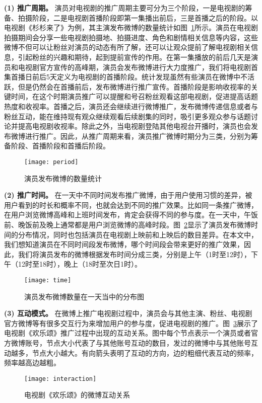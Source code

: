 \textbf{(1) 推广周期。}
演员对电视剧的推广周期主要可分为三个阶段，一是电视剧的筹备、拍摄阶段，二是电视剧首播阶段即第一集播出前后，三是首播之后的阶段。以电视剧《杉杉来了》为例，其主演发布微博的数量统计如图~\ref{shan}所示。演员在电视剧拍摄期间会分享一些电视剧拍摄地、拍摄进度、角色和剧情相关信息等内容，这些微博不但可以让粉丝对演员的动态有所了解，还可以让观众提前了解电视剧相关信息，引起粉丝的兴趣和期待，起到提前宣传的作用。在第一集播放的前后几天是演员和电视剧官方宣传的高峰期，演员会发布微博进行大力度推广，我们将电视剧首集首播日前后5天定义为电视剧的首播阶段。统计发现虽然有些演员在微博中不活跃，但是仍然会在首播前后，发布微博进行推广宣传。首播阶段是影响收视率的关键时间，在这个时期演员推广可以提醒和号召粉丝观看这部电视剧，促进提高话题热度和收视率。首播之后，演员还会继续进行微博推广，发布微博传递信息或者与粉丝互动，能在维持现有观众继续观看后续剧集的同时，吸引更多观众参与话题讨论并提高电视剧收视率。除此之外，当电视剧登陆其他电视台开播时，演员也会发布微博进行推广。因此，从推广周期来看，演员推广微博时期分为三类，分别为筹备阶段、首播阶段和首播后阶段。

\begin{figure}[!htp]
\centering
\texttt{[image: period]}
\caption{演员发布微博的数量统计}
\label{shan}
\end{figure}

\textbf{(2) 推广时间。}
在一天中不同时间发布推广微博，由于用户使用习惯的差异，被用户看到的时长和概率不同，也就会达到不同的推广效果。比如同一条推广微博，在用户浏览微博高峰和上班时间发布，肯定会获得不同的参与度。在一天中，午饭前、晚饭前及晚上通常都是用户浏览微博的高峰时段。图~\ref{time}显示了演员发布微博时间的分布情况，同时也包括演员在电视剧上映前和上映后的数目差异。在本文中，我们想知道演员在不同时间段发布微博，哪个时间段会带来更好的推广效果，因此，我们将演员发布的微博根据发布时间分成三类，分别是上午（1时至12时），下午（12时至18时），晚上（18时至次日1时）。

\begin{figure}[!htbp]
\centering
\texttt{[image: time]}
\caption{演员发布微博数量在一天当中的分布图}
\label{time}
\end{figure}

\textbf{(3) 互动模式。}
在微博上推广电视剧过程中，演员会与其他主演、粉丝、电视剧官方微博等有很多交互行为来增加用户的参与度，促进电视剧的推广。图~\ref{inter2}展示了电视剧《欢乐颂》推广过程中出现的互动关系。图中每个节点表示一个演员或者官方微博账号，节点大小代表了与其他账号互动的数目，发过的微博中与其他账号互动越多，节点大小越大。有向箭头表明了互动的方向，边的粗细代表互动的频率，频率越高边越粗。
\begin{figure}[!htbp]
\centering
\texttt{[image: interaction]}
\caption{电视剧《欢乐颂》的微博互动关系}
\label{inter2}
\end{figure}

